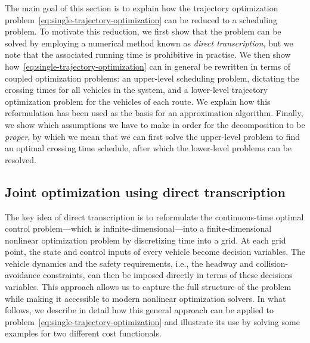 \documentclass[a4paper]{report}
\theoremstyle{definition}
\theoremstyle{plain}
\begin{document}
The main goal of this section is to explain how the trajectory optimization
problem~\eqref{eq:single-trajectory-optimization} can be reduced to a scheduling
problem.
%
To motivate this reduction, we first show that the problem can be solved by
employing a numerical method known as \emph{direct transcription}, but we note
that the associated running time is prohibitive in practise.
%
We then show how~\eqref{eq:single-trajectory-optimization} can in general be
rewritten in terms of coupled optimization problems: an upper-level scheduling
problem, dictating the crossing times for all vehicles in the system, and a
lower-level trajectory optimization problem for the vehicles of each route. We
explain how this reformulation has been used as the basis for an approximation
algorithm.
%
Finally, we show which assumptions we have to make in order for the
decomposition to be \emph{proper}, by which we mean that we can first solve the
upper-level problem to find an optimal crossing time schedule, after which the
lower-level problems can be resolved.


\subsection{Joint optimization using direct transcription}\label{sec:direct-transcription}

The key idea of direct transcription is to reformulate the continuous-time
optimal control problem---which is infinite-dimensional---into a
finite-dimensional nonlinear optimization problem by discretizing time into a
grid.
%
At each grid point, the state and control inputs of every vehicle become
decision variables. The vehicle dynamics and the safety requirements, i.e., the
headway and collision-avoidance constraints, can then be imposed directly in
terms of these decisions variables.
%
This approach allows us to capture the full structure of the problem while
making it accessible to modern nonlinear optimization solvers.
%
In what follows, we describe in detail how this general approach can be applied
to problem~\eqref{eq:single-trajectory-optimization} and illustrate its use by
solving some examples for two different cost functionals.
\end{document}
